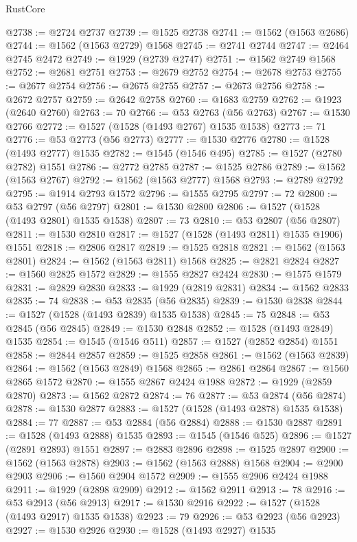 \begin{lexlean}{RustCore}
\begin{coremodule}
@2738 := @2724 @2737
@2739 := @1525 @2738
@2741 := @1562 (@1563 @2686)
@2744 := @1562 (@1563 @2729) @1568
@2745 := @2741 @2744
@2747 := @2464 @2745 @2472
@2749 := @1929 (@2739 @2747)
@2751 := @1562 @2749 @1568
@2752 := @2681 @2751
@2753 := @2679 @2752
@2754 := @2678 @2753
@2755 := @2677 @2754
@2756 := @2675 @2755
@2757 := @2673 @2756
@2758 := @2672 @2757
@2759 := @2642 @2758
@2760 := @1683 @2759
@2762 := @1923 (@2640 @2760)
@2763 := 70
@2766 := @53 @2763 (@56 @2763)
@2767 := @1530 @2766
@2772 := @1527 (@1528 (@1493 @2767) @1535 @1538)
@2773 := 71
@2776 := @53 @2773 (@56 @2773)
@2777 := @1530 @2776
@2780 := @1528 (@1493 @2777) @1535
@2782 := @1545 (@1546 @495)
@2785 := @1527 (@2780 @2782) @1551
@2786 := @2772 @2785
@2787 := @1525 @2786
@2789 := @1562 (@1563 @2767)
@2792 := @1562 (@1563 @2777) @1568
@2793 := @2789 @2792
@2795 := @1914 @2793 @1572
@2796 := @1555 @2795
@2797 := 72
@2800 := @53 @2797 (@56 @2797)
@2801 := @1530 @2800
@2806 := @1527 (@1528 (@1493 @2801) @1535 @1538)
@2807 := 73
@2810 := @53 @2807 (@56 @2807)
@2811 := @1530 @2810
@2817 := @1527 (@1528 (@1493 @2811) @1535 @1906) @1551
@2818 := @2806 @2817
@2819 := @1525 @2818
@2821 := @1562 (@1563 @2801)
@2824 := @1562 (@1563 @2811) @1568
@2825 := @2821 @2824
@2827 := @1560 @2825 @1572
@2829 := @1555 @2827 @2424
@2830 := @1575 @1579
@2831 := @2829 @2830
@2833 := @1929 (@2819 @2831)
@2834 := @1562 @2833
@2835 := 74
@2838 := @53 @2835 (@56 @2835)
@2839 := @1530 @2838
@2844 := @1527 (@1528 (@1493 @2839) @1535 @1538)
@2845 := 75
@2848 := @53 @2845 (@56 @2845)
@2849 := @1530 @2848
@2852 := @1528 (@1493 @2849) @1535
@2854 := @1545 (@1546 @511)
@2857 := @1527 (@2852 @2854) @1551
@2858 := @2844 @2857
@2859 := @1525 @2858
@2861 := @1562 (@1563 @2839)
@2864 := @1562 (@1563 @2849) @1568
@2865 := @2861 @2864
@2867 := @1560 @2865 @1572
@2870 := @1555 @2867 @2424 @1988
@2872 := @1929 (@2859 @2870)
@2873 := @1562 @2872
@2874 := 76
@2877 := @53 @2874 (@56 @2874)
@2878 := @1530 @2877
@2883 := @1527 (@1528 (@1493 @2878) @1535 @1538)
@2884 := 77
@2887 := @53 @2884 (@56 @2884)
@2888 := @1530 @2887
@2891 := @1528 (@1493 @2888) @1535
@2893 := @1545 (@1546 @525)
@2896 := @1527 (@2891 @2893) @1551
@2897 := @2883 @2896
@2898 := @1525 @2897
@2900 := @1562 (@1563 @2878)
@2903 := @1562 (@1563 @2888) @1568
@2904 := @2900 @2903
@2906 := @1560 @2904 @1572
@2909 := @1555 @2906 @2424 @1988
@2911 := @1929 (@2898 @2909)
@2912 := @1562 @2911
@2913 := 78
@2916 := @53 @2913 (@56 @2913)
@2917 := @1530 @2916
@2922 := @1527 (@1528 (@1493 @2917) @1535 @1538)
@2923 := 79
@2926 := @53 @2923 (@56 @2923)
@2927 := @1530 @2926
@2930 := @1528 (@1493 @2927) @1535

\end{coremodule}
\end{lexlean}
